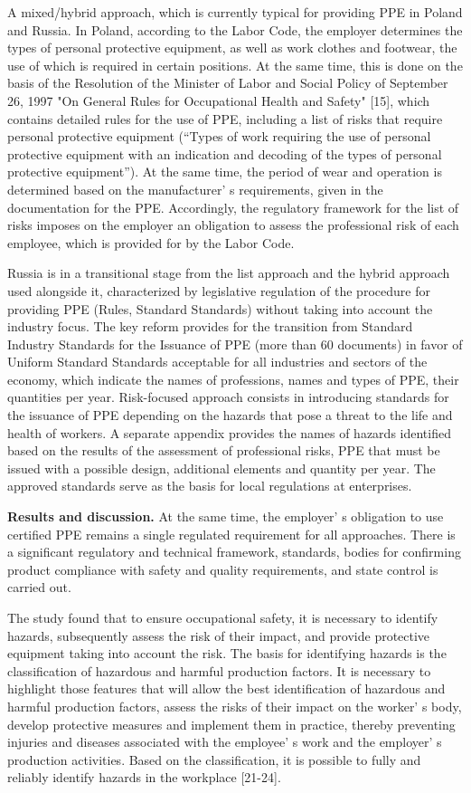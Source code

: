 {A mixed/hybrid approach, which is currently typical for providing PPE in
Poland and Russia. In Poland, according to the Labor Code, the employer
determines the types of personal protective equipment, as well as work
clothes and footwear, the use of which is required in certain positions.
At the same time, this is done on the basis of the Resolution of the
Minister of Labor and Social Policy of September 26, 1997 "On General
Rules for Occupational Health and Safety" {[}15{]}, which contains
detailed rules for the use of PPE, including a list of risks that
require personal protective equipment (``Types of work requiring the use
of personal protective equipment with an indication and decoding of the
types of personal protective equipment''). At the same time, the period
of wear and operation is determined based on the
manufacturer' s requirements, given in the documentation
for the PPE. Accordingly, the regulatory framework for the list of risks
imposes on the employer an obligation to assess the professional risk of
each employee, which is provided for by the Labor Code.

Russia is in a transitional stage from the list approach and the hybrid
approach used alongside it, characterized by legislative regulation of
the procedure for providing PPE (Rules, Standard Standards) without
taking into account the industry focus. The key reform provides for the
transition from Standard Industry Standards for the Issuance of PPE
(more than 60 documents) in favor of Uniform Standard Standards
acceptable for all industries and sectors of the economy, which indicate
the names of professions, names and types of PPE, their quantities per
year. Risk-focused approach consists in introducing standards for the
issuance of PPE depending on the hazards that pose a threat to the life
and health of workers. A separate appendix provides the names of hazards
identified based on the results of the assessment of professional risks,
PPE that must be issued with a possible design, additional elements and
quantity per year. The approved standards serve as the basis for local
regulations at enterprises.

{\bfseries Results and discussion.} At the same time, the
employer' s obligation to use certified PPE remains a
single regulated requirement for all approaches. There is a significant
regulatory and technical framework, standards, bodies for confirming
product compliance with safety and quality requirements, and state
control is carried out.

The study found that to ensure occupational safety, it is necessary to
identify hazards, subsequently assess the risk of their impact, and
provide protective equipment taking into account the risk. The basis for
identifying hazards is the classification of hazardous and harmful
production factors. It is necessary to highlight those features that
will allow the best identification of hazardous and harmful production
factors, assess the risks of their impact on the
worker' s body, develop protective measures and implement
them in practice, thereby preventing injuries and diseases associated
with the employee' s work and the
employer' s production activities. Based on the
classification, it is possible to fully and reliably identify hazards in
the workplace {[}21-24{]}.

}
